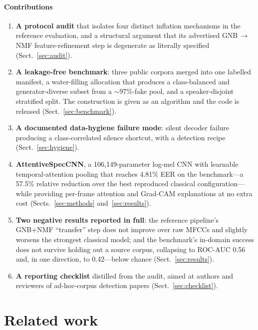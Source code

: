 \documentclass[sn-mathphys-num,pdflatex]{sn-jnl}
\begin{document}
\paragraph{Contributions}
\begin{enumerate}
\item \textbf{A protocol audit} that isolates four distinct inflation mechanisms
in the reference evaluation, and a structural argument that its advertised
GNB\,$\rightarrow$\,NMF feature-refinement step is degenerate as literally
specified (Sect.~\ref{sec:audit}).

\item \textbf{A leakage-free benchmark}: three public corpora merged into one
labelled manifest, a water-filling allocation that produces a class-balanced and
generator-diverse subset from a $\sim$97\%-fake pool, and a speaker-disjoint
stratified split. The construction is given as an algorithm and the code is
released (Sect.~\ref{sec:benchmark}).

\item \textbf{A documented data-hygiene failure mode}: silent decoder failure
producing a class-correlated silence shortcut, with a detection recipe
(Sect.~\ref{sec:hygiene}).

\item \textbf{AttentiveSpecCNN}, a 106{,}149-parameter log-mel CNN with learnable
temporal-attention pooling that reaches 4.81\% EER on the benchmark---a 57.5\%
relative reduction over the best reproduced classical configuration---while
providing per-frame attention and Grad-CAM explanations at no extra cost
(Sects.~\ref{sec:methods} and~\ref{sec:results}).

\item \textbf{Two negative results reported in full}: the reference pipeline's
GNB+NMF ``transfer'' step does not improve over raw MFCCs and slightly worsens
the strongest classical model; and the benchmark's in-domain success does not
survive holding out a source corpus, collapsing to ROC-AUC 0.56 and, in one
direction, to 0.42---below chance
(Sect.~\ref{sec:results}).

\item \textbf{A reporting checklist} distilled from the audit, aimed at authors
and reviewers of ad-hoc-corpus detection papers (Sect.~\ref{sec:checklist}).
\end{enumerate}

\section{Related work}\label{sec:related}
\end{document}

